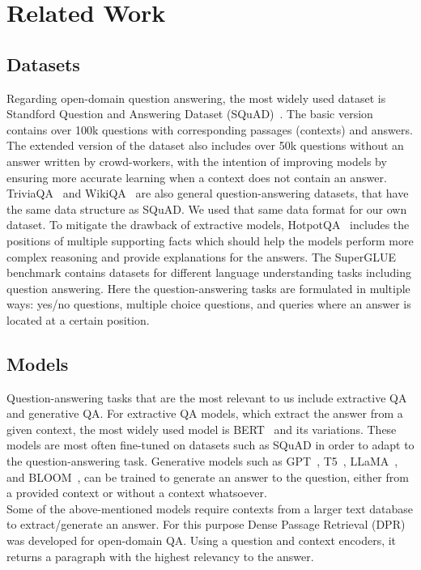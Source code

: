 \documentclass[fleqn,moreauthors,10pt]{ds_report}
\newcounter{intro}
\begin{document}
\section*{Related Work}

\subsection*{Datasets}
\label{sec:datasets}

Regarding open-domain question answering, the most widely used dataset is Standford Question and Answering Dataset (SQuAD)~\cite{rajpurkar2016squad, rajpurkar2018squadv2}.
The basic version contains over 100k questions with corresponding passages (contexts) and answers.
The extended version of the dataset also includes over 50k questions without an answer written by crowd-workers, with the intention of improving models by ensuring more accurate learning when a context does not contain an answer.
TriviaQA~\cite{joshi2017triviaqa} and WikiQA~\cite{yang2015wikiqa} are also general question-answering datasets, that have the same data structure as SQuAD.
We used that same data format for our own dataset. 
To mitigate the drawback of extractive models, HotpotQA~\cite{yang2018hotpotqa} includes the positions of multiple supporting facts which should help the models perform more complex reasoning and provide explanations for the answers.
The SuperGLUE~\cite{SuperGLUE} benchmark contains datasets for different language understanding tasks including question answering. 
Here the question-answering tasks are formulated in multiple ways: yes/no questions, multiple choice questions, and queries where an answer is located at a certain position.

\subsection*{Models}
Question-answering tasks that are the most relevant to us include extractive QA and generative QA.
For extractive QA models, which extract the answer from a given context, the most widely used model is BERT~\cite{devlin2019bert} and its variations.
These models are most often fine-tuned on datasets such as SQuAD in order to adapt to the question-answering task.
Generative models such as GPT~\cite{openai2023gpt4}, T5~\cite{T5}, LLaMA~\cite{touvron2023llama}, and BLOOM~\cite{scao2022bloom}, can be trained to generate an answer to the question, either from a provided context or without a context whatsoever. \\
Some of the above-mentioned models require contexts from a larger text database to extract/generate an answer. 
For this purpose Dense Passage Retrieval (DPR) \cite{karpukhin2020dense} was developed for open-domain QA. 
Using a question and context encoders, it returns a paragraph with the highest relevancy to the answer.
\end{document}
